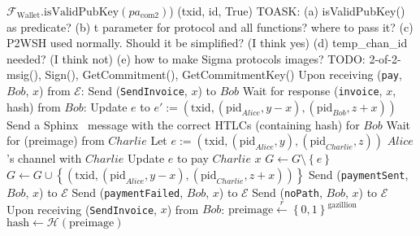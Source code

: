 \begin{algorithmic}[1]
        \Indent
          \State $\mathcal{F}_{\mathrm{Wallet}}.\mathrm{isValidPubKey}
          \left(pa_{\mathrm{com}2}\right)$)
        \EndIndent
      \EndIndent
      \State \Return (txid, id, True)
    \EndFunction
    \State
    \State TOASK: (a) isValidPubKey() as predicate? (b) t parameter for protocol and all
    functions? where to pass it? (c) P2WSH used normally. Should it be simplified? (I
    think yes) (d) temp\_chan\_id needed? (I think not) (e) how to make Sigma protocols
    images?
    \State TODO: 2-of-2-msig(), Sign(), GetCommitment(), GetCommitmentKey()
    \State
    \State Upon receiving (\texttt{pay}, $Bob$, $x$) from $\mathcal{E}$:
      \State Send (\texttt{SendInvoice}, $x$) to $Bob$
      \State Wait for response (\texttt{invoice}, $x$, hash) from $Bob$:
        \State Update $e$ to $e' := \left(\mathrm{txid},
        \left(\mathrm{pid}_{Alice}, y - x\right),
        \left(\mathrm{pid}_{Bob}, z + x\right)\right)$ 
        \State Send a Sphinx~\cite{sphinx} message with the correct HTLCs (containing
        hash) for $Bob$
        \State {}
        \State Wait for (preimage) from $Charlie$
          \State Let $e := \left(\mathrm{txid}, \left(\mathrm{pid}_{Alice}, y\right),
          \left(\mathrm{pid}_{Charlie}, z\right)\right)$ $Alice$'s channel with $Charlie$
          \State Update $e$ to pay $Charlie$ $x$ 
          \State $G \leftarrow G \setminus \left\{e\right\}$
          \State $G \leftarrow G \cup \left\{\left(\mathrm{txid},
          \left(\mathrm{pid}_{Alice}, y - x\right), \left(\mathrm{pid}_{Charlie}, z +
          x\right)\right)\right\}$
          \State Send (\texttt{paymentSent}, $Bob$, $x$) to $\mathcal{E}$
        \Else
          \State Send (\texttt{paymentFailed}, $Bob$, $x$) to $\mathcal{E}$
        \EndIf
      \Else
        \State Send (\texttt{noPath}, $Bob$, $x$) to $\mathcal{E}$
      \EndIf
    \State
    \State Upon receiving (\texttt{SendInvoice}, $x$) from $Bob$:
      \State $\mathrm{preimage} \overset{r}{\leftarrow}
      \left\{0,1\right\}^{\mathrm{gazillion}}$
      \State $\mathrm{hash} \leftarrow \mathcal{H}\left(\mathrm{preimage}\right)$

\end{algorithmic}
